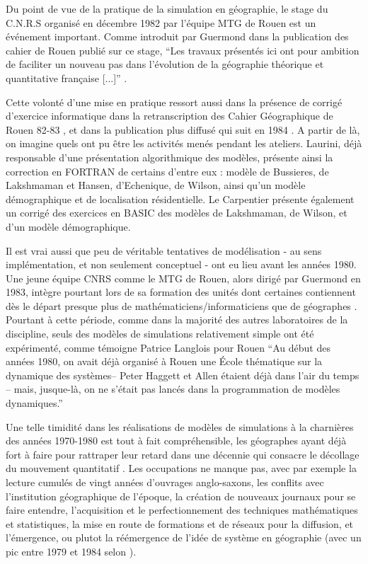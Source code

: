 Du point de vue de la pratique de la simulation en géographie, le stage du C.N.R.S organisé en décembre 1982 par l'équipe MTG de Rouen est un événement important. Comme introduit par Guermond dans la publication des cahier de Rouen publié sur ce stage, \enquote{Les travaux présentés ici ont pour ambition de faciliter un nouveau pas dans l'évolution de la géographie théorique et quantitative française [...]} \autocite{Guermond1983}.

Cette volonté d'une mise en pratique ressort aussi dans la présence de corrigé d'exercice informatique dans la retranscription des Cahier Géographique de Rouen 82-83 \autocite{CGR1983}, et dans la publication plus diffusé qui suit en 1984 \autocite{Guermond1984}. A partir de là, on imagine quels ont pu être les activités menés pendant les ateliers. Laurini, déjà responsable d'une présentation algorithmique des modèles, présente ainsi la correction en FORTRAN de certains d'entre eux : modèle de Bussieres, de Lakshmaman et Hansen, d'Echenique, de Wilson, ainsi qu'un modèle démographique et de localisation résidentielle. Le Carpentier présente également un corrigé des exercices en BASIC des modèles de Lakshmaman, de Wilson, et d'un modèle démographique.

Il est vrai aussi que peu de véritable tentatives de modélisation - au sens implémentation, et non seulement conceptuel - ont eu lieu avant les années 1980. Une jeune équipe CNRS comme le MTG de Rouen, alors dirigé par Guermond en 1983, intègre pourtant lors de sa formation des unités dont certaines contiennent dès le départ presque plus de mathématiciens/informaticiens que de géographes . Pourtant à cette période, comme dans la majorité des autres laboratoires de la discipline, seuls des modèles de simulations relativement simple ont été expérimenté, comme témoigne Patrice Langlois pour Rouen \enquote{Au début des années 1980, on avait déjà organisé à Rouen une École thématique sur la dynamique des systèmes– Peter Haggett et Allen étaient déjà dans l’air du temps – mais, jusque-là, on ne s’était pas lancés dans la programmation de modèles dynamiques.} \autocite{Mathieu2014} 

Une telle timidité dans les réalisations de modèles de simulations à la charnières des années 1970-1980 est tout à fait compréhensible, les géographes ayant déjà fort à faire pour rattraper leur retard dans une décennie qui consacre le décollage du mouvement quantitatif \autocite{Cuyala2014, Orain2014}. Les occupations ne manque pas, avec par exemple la lecture cumulés de vingt années d'ouvrages anglo-saxons, les conflits avec l'institution géographique de l'époque, la création de nouveaux journaux pour se faire entendre, l'acquisition et le perfectionnement des techniques mathématiques et statistiques, la mise en route de formations et de réseaux pour la diffusion, et l'émergence, ou plutot la réémergence de l'idée de système en géographie (avec un pic entre 1979 et 1984 selon \textcite{Orain2001}).

